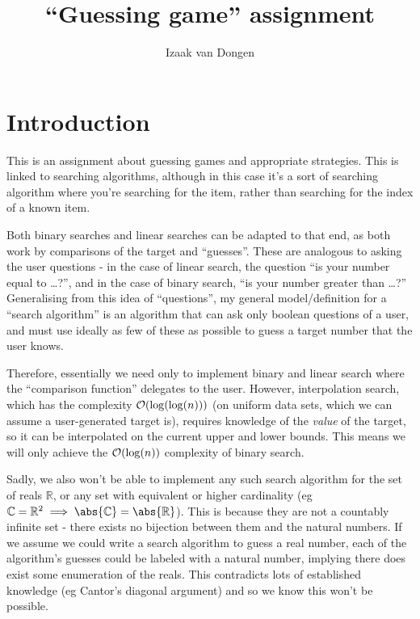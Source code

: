 \documentclass[fleqn,a4paper,11pt]{article}
\title{``Guessing game'' assignment}
\author{Izaak van Dongen}
\begin{document}
    \maketitle
    \tableofcontents
    \lstlistoflistings
    \listoffigures

    \section{Introduction}

    This is an assignment about guessing games and appropriate strategies. This
    is linked to searching algorithms, although in this case it's a sort of
    searching algorithm where you're searching for the item, rather than
    searching for the index of a known item.

    Both binary searches and linear searches can be adapted to that end, as both
    work by comparisons of the target and ``guesses''. These are analogous to
    asking the user questions - in the case of linear search, the question ``is
    your number equal to \ldots?'', and in the case of binary search, ``is your
    number greater than \ldots?'' Generalising from this idea of ``questions'',
    my general model/definition for a ``search algorithm'' is an algorithm that
    can ask only boolean questions of a user, and must use ideally as few of
    these as possible to guess a target number that the user knows.

    Therefore, essentially we need only to implement binary and linear search
    where the ``comparison function'' delegates to the user.  However,
    interpolation search, which has the complexity \(\operatorname{\mathcal O}(\log(\log(n)))\) (on
    uniform data sets, which we can assume a user-generated target is), requires
    knowledge of the \emph{value} of the target, so it can be interpolated on
    the current upper and lower bounds. This means we will only achieve the
    \(\operatorname{\mathcal O}(\log(n))\) complexity of binary search.

    Sadly, we also won't be able to implement any such search algorithm for the
    set of reals \(\mathbb{R}\), or any set with equivalent or higher cardinality
    (eg \(\mathbb{C} = \mathbb{R}^2 \implies \abs{\mathbb{C}} =
    \abs{\mathbb{R}}\)). This is because they are not a countably infinite set -
    there exists no bijection between them and the natural numbers. If we assume
    we could write a search algorithm to guess a real number, each of the
    algorithm's guesses could be labeled with a natural number, implying there
    does exist some enumeration of the reals. This contradicts lots of
    established knowledge (eg Cantor's diagonal argument) and so we know this
    won't be possible.
\end{document}
